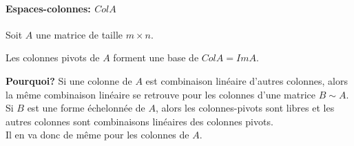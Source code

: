 \paragraph{Espaces-colonnes: $ColA$}
Soit $A$ une matrice de taille $m \times n$.
\begin{theoreme}
    Les colonnes pivots de $A$ forment une base de $ColA = Im A$.
\end{theoreme}
\textbf{Pourquoi?} Si une colonne de $A$ est combinaison linéaire d'autres colonnes, alors la même combinaison linéaire se retrouve pour les colonnes d'une matrice $B \sim A$. \\
Si $B$ est une forme échelonnée de $A$, alors les colonnes-pivots sont libres et les autres colonnes sont combinaisons linéaires des colonnes pivots.
\\
Il en va donc de même pour les colonnes de $A$.